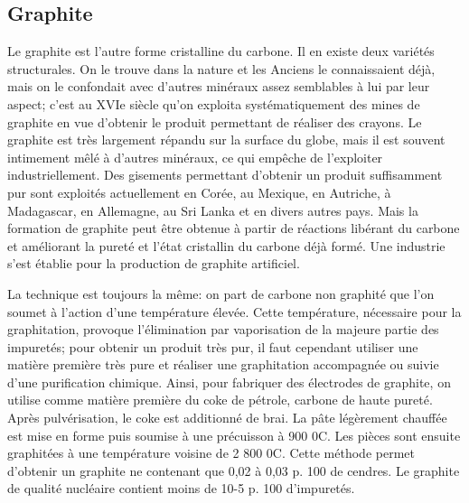 \documentclass[a4 paper, 10 pt]{article}
\begin{document}
\subsection{Graphite} 




Le graphite est l'autre forme cristalline du carbone. 
Il en existe deux variétés structurales. On le trouve dans la nature
et les Anciens le connaissaient déjà, mais on le confondait avec
d'autres minéraux assez semblables à lui par leur aspect; c'est
au XVIe siècle qu'on exploita systématiquement des mines de
graphite en vue d'obtenir le produit permettant de réaliser des
crayons. Le graphite est très largement répandu sur la surface
du globe, mais il est souvent intimement mêlé à d'autres
minéraux, ce qui empêche de l'exploiter industriellement. Des
gisements permettant d'obtenir un produit suffisamment pur sont
exploités actuellement en Corée, au Mexique, en Autriche, à
Madagascar, en Allemagne, au Sri Lanka et en divers autres pays. Mais
la formation de graphite peut être obtenue à partir de
réactions libérant du carbone et améliorant la pureté et
l'état cristallin du carbone déjà formé. Une industrie
s'est établie pour la production de graphite artificiel.\newline 



La technique est toujours la même: on part de carbone non graphité
que l'on soumet à l'action d'une température élevée. Cette
température, nécessaire pour la graphitation, provoque
l'élimination par vaporisation de la majeure partie des
impuretés; pour obtenir un produit très pur, il faut cependant
utiliser une matière première très pure et réaliser une
graphitation accompagnée ou suivie d'une purification
chimique. Ainsi, pour fabriquer des électrodes de graphite, on
utilise comme matière première du coke de pétrole, carbone de
haute pureté. Après pulvérisation, le coke est additionné
de brai. La pâte légèrement chauffée est mise en forme
puis soumise à une précuisson à 900 0C. Les pièces sont
ensuite graphitées à une température voisine de
2 800 0C. Cette méthode permet d'obtenir un graphite ne
contenant que 0,02 à 0,03 p. 100 de cendres. Le graphite de
qualité nucléaire contient moins de 10-5 p. 100
d'impuretés.\newline 
 
\end{document}
